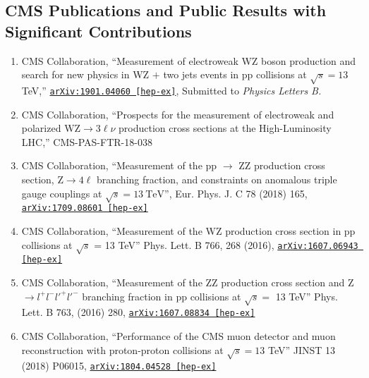 \documentclass[10pt]{res} %
\begin{document}
\begin{resume}
\section{CMS Publications and Public Results with Significant Contributions}
\begin{enumerate}
  \item CMS Collaboration, ``Measurement of electroweak WZ boson production and search for new physics in WZ $+$ two jets events in pp collisions at $\sqrt{s}=13$\,TeV,'' \href{https://arxiv.org/abs/1901.04060} {\texttt{arXiv:1901.04060 [hep-ex]}}, Submitted to \textit{Physics Letters B.}
  \item CMS Collaboration, ``Prospects for the measurement of electroweak and polarized $\mathrm{WZ}\to3\ell\nu$ production cross sections at the High-Luminosity LHC,'' CMS-PAS-FTR-18-038
  \item CMS Collaboration, ``Measurement of the pp $\rightarrow$ ZZ production cross section, $\mathrm{Z} \to 4\ell$ branching fraction, and constraints on anomalous triple gauge couplings at $\sqrt{s} = 13~\mathrm{TeV}$'', Eur. Phys. J. C 78 (2018) 165, \href{https://arxiv.org/abs/1709.08601}{\texttt{arXiv:1709.08601 [hep-ex]}}
  \item CMS Collaboration, ``Measurement of the WZ production cross section in pp collisions at $\sqrt{s}$ = 13 TeV''
Phys. Lett. B 766, 268 (2016), \href{https://arxiv.org/abs/1607.06943}{\texttt{arXiv:1607.06943 [hep-ex]}}
  \item CMS Collaboration, ``Measurement of the ZZ production cross section and Z $\rightarrow l^{+}l^{-}l'^{+}l'^{-}$ branching fraction in pp collisions at $\sqrt{s} =$ 13 TeV''
Phys. Lett. B 763, (2016) 280, \href{https://arxiv.org/abs/1607.08834} {\texttt{arXiv:1607.08834 [hep-ex]}}
  \item CMS Collaboration, ``Performance of the CMS muon detector and muon reconstruction with proton-proton collisions at $\sqrt{s} = 13$ TeV''
JINST 13 (2018) P06015, \href{https://arxiv.org/abs/1804.04528} {\texttt{arXiv:1804.04528 [hep-ex]}}
\end{enumerate}


\end{resume}
\end{document}
